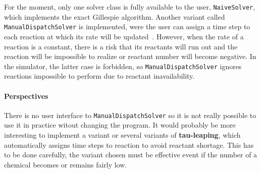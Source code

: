 For the moment, only one solver class is fully available to the user, \texttt{NaiveSolver}, which implements the exact Gillespie algorithm. Another variant called \texttt{ManualDispatchSolver} is implemented, were the user can assign a time step to each reaction at which its rate will be updated~. However, when the rate of a reaction is a constant, there is a risk that its reactants will run out and the reaction will be impossible to realize or reactant number will become negative. In the simulator, the latter case is forbidden, so \texttt{ManualDispatchSolver} ignores reactions impossible to perform due to reactant inavailability. 

\paragraph{Perspectives} There is no user interface to \texttt{ManualDispatchSolver} so it is not really possible to use it in practice witout changing the program. It would probably be more interesting to implement a variant or several variants of \textbf{tau-leaping}, which automatically assigns time steps to reaction to avoid reactant shortage. This has to be done carefully, the variant chosen must be effective event if the number of a chemical becomes or remains fairly low.

